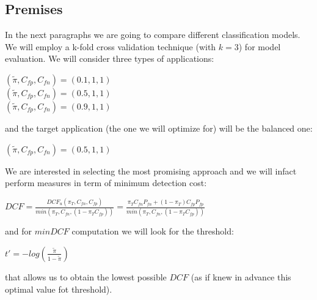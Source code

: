 \documentclass[10pt, a4paper, twocolumn]{article} %
\begin{document}
\subsection{Premises}
In the next paragraphs we are going to compare different classification models. 
We will employ a k-fold cross validation technique (with $k=3$) for model evaluation.
We will consider three types of applications:
\begin{center}
	$(\tilde{\pi}, C_{fp}, C_{fn}) = (0.1, 1, 1)$\\
	$(\tilde{\pi}, C_{fp}, C_{fn}) = (0.5, 1, 1)$\\
	$(\tilde{\pi}, C_{fp}, C_{fn}) = (0.9, 1, 1)$\\
\end{center}
and the target application (the one we will optimize for) will be the balanced one:
\begin{center}
	$(\tilde{\pi}, C_{fp}, C_{fn}) = (0.5, 1, 1)$
\end{center}
We are interested
in selecting the most promising approach and we will infact perform measures in term of minimum
detection cost:
\begin{center}
	\begin{math}
		DCF = \frac{DCF_{u}(\pi_{T}, C_{fn}, C_{fp})}{min(\pi_{T},C_{fn}, (1-\pi_{T}C_{fp}))} = 
			\frac{\pi_{T}C_{fn}P_{fn} + (1-\pi_{T})C_{fp}P_{fp}}{min(\pi_{T},C_{fn}, (1-\pi_{T}C_{fp}))}
	\end{math}
\end{center}
and for $minDCF$ computation we will look for the threshold:
\begin{center}
	\begin{math}
		t' = -log(\frac{\tilde{\pi}}{1-\tilde{\pi}})
	\end{math}
\end{center}
that allows us to obtain the lowest possible $DCF$ (as if knew in advance this optimal value fot threshold).
\end{document}
